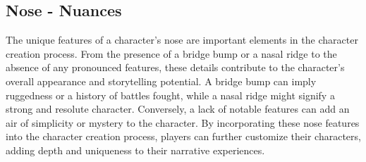 \documentclass[12pt]{book}  %
\begin{document}
\subsection{\textbf{Nose - Nuances}}

The unique features of a character's nose are important elements in the character creation process. From the presence of a bridge bump or a nasal ridge to the absence of any pronounced features, these details contribute to the character's overall appearance and storytelling potential. A bridge bump can imply ruggedness or a history of battles fought, while a nasal ridge might signify a strong and resolute character. Conversely, a lack of notable features can add an air of simplicity or mystery to the character. By incorporating these nose features into the character creation process, players can further customize their characters, adding depth and uniqueness to their narrative experiences.
\end{document}
